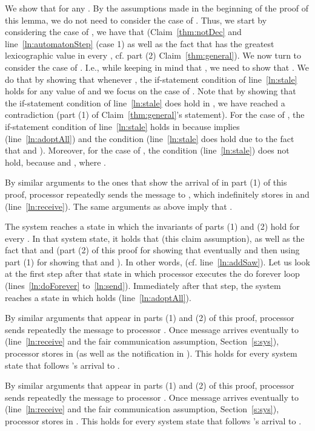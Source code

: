 \documentclass[11pt]{article}
\newenvironment{proof}{\noindent{\bf Proof.}}{\hfill}
\begin{document}
\begin{proof}
\begin{proof}
We show that  for any . By the assumptions made in the beginning of the proof of this lemma, we do not need to consider the case of . Thus, we start by considering the case of , we have that  (Claim~\ref{thm:notDec} and line~\ref{ln:automatonStep} (case 1) as well as the fact that  has the greatest lexicographic value in every , cf. part (2) Claim~\ref{thm:general}).
We now turn to consider the case of . I.e.,  while keeping in mind that , we need to show that .
We do that by showing that whenever , the if-statement condition of line~\ref{ln:stale} holds for any value of  and we focus on the case of . Note that by showing that the if-statement condition of line~\ref{ln:stale} does hold in , we have reached  a contradiction (part (1) of Claim~\ref{thm:general}'s statement). 
For the case of , the if-statement condition of line~\ref{ln:stale} holds in  because  implies  (line~\ref{ln:adoptAll}) and the condition  (line~\ref{ln:stale} does hold due to the fact that   and ). Moreover, for the case of , the condition   (line~\ref{ln:stale}) does not hold, because  and , where .






 By similar arguments to the ones that show the arrival of  in part (1) of this proof, processor   repeatedly sends the message  to , which indefinitely stores  in  and  (line~\ref{ln:receive}). The same arguments as above imply that .

 The system reaches a state in which the invariants of parts (1) and (2) hold for every . In that system state, it holds that  (this claim assumption), as well as the fact that   and  (part (2) of this proof for showing that  eventually and then using part (1) for showing that 
 and ). In other words, 
(cf. line~\ref{ln:addSaw}). 
Let us look at the first step after that state in which processor  executes the do forever loop (lines~\ref{ln:doForever} to~\ref{ln:send}). Immediately after that step, the system reaches a state in which  holds (line~\ref{ln:adoptAll}).

 By similar arguments that appear in parts (1) and (2) of this proof, processor  sends repeatedly the message  to processor . Once message  arrives eventually to  (line~\ref{ln:receive} and the fair communication assumption, Section~\ref{s:sys}), processor  stores  in  (as well as the notification  in ). This holds for every system state  that follows 's arrival to . 

 By similar arguments that appear in parts (1) and (2) of this proof, processor  sends repeatedly the message  to processor . Once message  arrives eventually to  (line~\ref{ln:receive} and the fair communication assumption, Section~\ref{s:sys}), processor  stores  in . This holds for every system state  that follows 's arrival to . 


\end{proof}
\end{proof}
\end{document}
